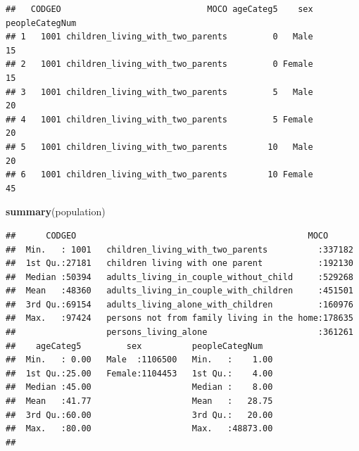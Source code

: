 \documentclass[]{article}
\newenvironment{Shaded}{\begin{snugshade}}{\end{snugshade}}
\newcommand{\KeywordTok}[1]{\textcolor[rgb]{0.13,0.29,0.53}{\textbf{#1}}}
\newcommand{\DecValTok}[1]{\textcolor[rgb]{0.00,0.00,0.81}{#1}}
\newcommand{\StringTok}[1]{\textcolor[rgb]{0.31,0.60,0.02}{#1}}
\newcommand{\CommentTok}[1]{\textcolor[rgb]{0.56,0.35,0.01}{\textit{#1}}}
\newcommand{\OperatorTok}[1]{\textcolor[rgb]{0.81,0.36,0.00}{\textbf{#1}}}
\newcommand{\NormalTok}[1]{#1}
\begin{document}
\begin{Shaded}
\end{Shaded}

\begin{verbatim}
##   CODGEO                             MOCO ageCateg5    sex peopleCategNum
## 1   1001 children_living_with_two_parents         0   Male             15
## 2   1001 children_living_with_two_parents         0 Female             15
## 3   1001 children_living_with_two_parents         5   Male             20
## 4   1001 children_living_with_two_parents         5 Female             20
## 5   1001 children_living_with_two_parents        10   Male             20
## 6   1001 children_living_with_two_parents        10 Female             45
\end{verbatim}

\begin{Shaded}
\begin{Highlighting}[]
\KeywordTok{summary}\NormalTok{(population)}
\end{Highlighting}
\end{Shaded}

\begin{verbatim}
##      CODGEO                                              MOCO       
##  Min.   : 1001   children_living_with_two_parents          :337182  
##  1st Qu.:27181   children living with one parent           :192130  
##  Median :50394   adults_living_in_couple_without_child     :529268  
##  Mean   :48360   adults_living_in_couple_with_children     :451501  
##  3rd Qu.:69154   adults_living_alone_with_children         :160976  
##  Max.   :97424   persons not from family living in the home:178635  
##                  persons_living_alone                      :361261  
##    ageCateg5         sex          peopleCategNum    
##  Min.   : 0.00   Male  :1106500   Min.   :    1.00  
##  1st Qu.:25.00   Female:1104453   1st Qu.:    4.00  
##  Median :45.00                    Median :    8.00  
##  Mean   :41.77                    Mean   :   28.75  
##  3rd Qu.:60.00                    3rd Qu.:   20.00  
##  Max.   :80.00                    Max.   :48873.00  
## 
\end{verbatim}
\end{document}
